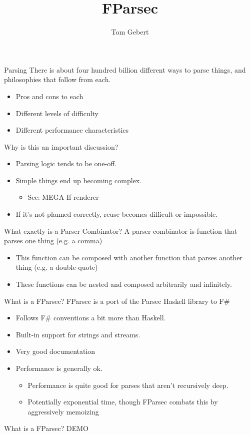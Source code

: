 \documentclass{beamer}
\title{FParsec}
\author{Tom Gebert}
\begin{document}
\frame{\titlepage}
\begin{frame} {Parsing}
There is about four hundred billion different ways to parse things, and philosophies that follow from each. 
\begin{itemize}
    \item Pros and cons to each
    \item Different levels of difficulty
    \item Different performance characteristics
\end{itemize}
  
\end{frame}
\begin{frame} {Why is this an important discussion?}
    
    \begin{itemize}
    	\item Parsing logic tends to be one-off. 
    	\item Simple things end up becoming complex. \begin{itemize}
    		\item See: MEGA If-renderer
    	\end{itemize}
    	\item If it's not planned correctly, reuse becomes difficult or impossible. 
    \end{itemize}
\end{frame}
\begin{frame}{What exactly is a Parser Combinator?}
	A parser combinator is function that parses one thing (e.g. a comma)
	\begin{itemize}
	    \item This function can be composed with another function that parses another thing (e.g. a double-quote)
	    \item These functions can be nested and composed arbitrarily and infinitely. 
	\end{itemize}
\end{frame}
\begin{frame}{What is a FParsec?}
   FParsec is a port of the Parsec Haskell library to F\#
   \begin{itemize}
   	 \item Follows F\# conventions a bit more than Haskell.
   	 \item Built-in support for strings and streams. 
   	 \item Very good documentation 
   	 \item Performance is generally ok.\begin{itemize}
   	     \item Performance is quite good for parses that aren't recursively deep.
   	     \item Potentially exponential time, though FParsec combats this by aggressively memoizing
   	 \end{itemize}
   \end{itemize}
\end{frame}
\begin{frame}{What is a FParsec?}
DEMO
\end{frame}
\end{document}
